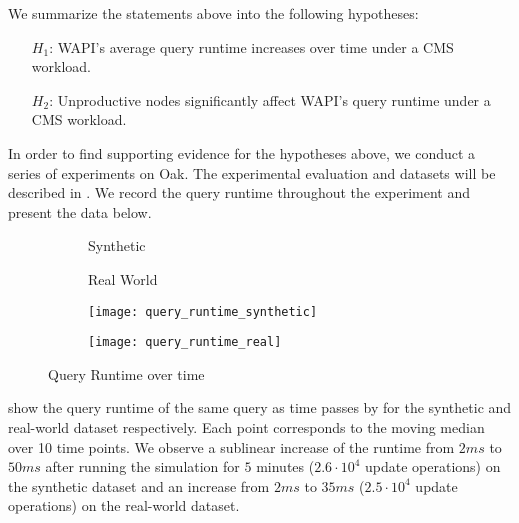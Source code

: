 \documentclass[abstracton,12pt]{scrartcl}
\theoremstyle{definition}
\begin{document}
We summarize the statements above into the following hypotheses:

\begin{shaded}
  \begin{itemize}
  \item[$H_1$:] WAPI's average query runtime increases over time under a CMS workload.
  \item[$H_2$:] Unproductive nodes significantly affect WAPI's query runtime
    under a CMS workload. 
  \end{itemize}
\end{shaded}

In order to find supporting evidence for the hypotheses above, we conduct a series of
experiments on Oak. The experimental evaluation and
datasets will be described in . We
record the query runtime throughout the experiment and present the data below.

\begin{figure}
  \centering
  \begin{subfigure}{0.49\linewidth}
    \centering
    Synthetic
  \end{subfigure}
  \begin{subfigure}{0.49\linewidth}
    \centering
    Real World
  \end{subfigure}
  \begin{subfigure}{0.49\linewidth}
    \centering
    \texttt{[image: query\_runtime\_synthetic]}
    \caption{}
    \label{fig:query_runtime_synthetic}
  \end{subfigure}
  \begin{subfigure}{0.49\linewidth}
    \centering
    \texttt{[image: query\_runtime\_real]}
    \caption{}
    \label{fig:query_runtime_real}
  \end{subfigure}
  \caption{Query Runtime over time}
  \label{fig:query_runtime}
\end{figure}

 show the 
query runtime of the same query as time passes by for the synthetic and
real-world dataset respectively. 
Each point corresponds to the moving median over 10 time points.
We observe a sublinear increase of the runtime from $2 ms$ to $50 ms$
after running the simulation for $5$ minutes ($2.6 \cdot 10^4$ update operations)
on the synthetic dataset and an increase from $2 ms$ to $35 ms$ ($2.5 \cdot
10^4$ update operations) on the real-world dataset. 
\end{document}
